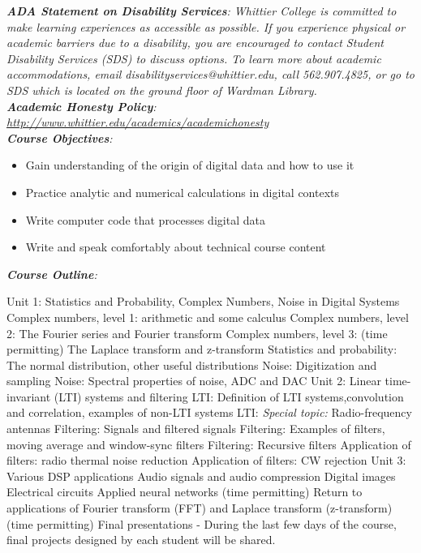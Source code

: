 \documentclass[10pt]{article}
\begin{document}
\textit{\textbf{ADA Statement on Disability Services}: Whittier College is committed to make learning experiences as accessible as possible.  If you experience physical or academic barriers due to a disability, you are encouraged to contact Student Disability Services (SDS) to discuss options.  To learn more about academic accommodations, email disabilityservices@whittier.edu, call 562.907.4825, or go to SDS which is located on the ground floor of Wardman Library.} \\
\textit{\textbf{Academic Honesty Policy}: \url{http://www.whittier.edu/academics/academichonesty}} \\
\clearpage
\textit{\textbf{Course Objectives}:}
\begin{itemize}
\item Gain understanding of the origin of digital data and how to use it
\item Practice analytic and numerical calculations in digital contexts
\item Write computer code that processes digital data
\item Write and speak comfortably about technical course content
\end{itemize}
\textit{\textbf{Course Outline}:}
\begin{outline}[enumerate]
\1 Unit 1: Statistics and Probability, Complex Numbers, Noise in Digital Systems
\2 Complex numbers, level 1: arithmetic and some calculus
\2 Complex numbers, level 2: The Fourier series and Fourier transform
\2 Complex numbers, level 3: (time permitting) The Laplace transform and z-transform
\2 Statistics and probability: The normal distribution, other useful distributions
\2 Noise: Digitization and sampling
\2 Noise: Spectral properties of noise, ADC and DAC
\1 Unit 2: Linear time-invariant (LTI) systems and filtering
\2 LTI: Definition of LTI systems,convolution and correlation, examples of non-LTI systems
\2 LTI: \textit{Special topic:} Radio-frequency antennas
\2 Filtering: Signals and filtered signals
\2 Filtering: Examples of filters, moving average and window-sync filters
\2 Filtering: Recursive filters
\2 Application of filters: radio thermal noise reduction
\2 Application of filters: CW rejection
\1 Unit 3: Various DSP applications
\2 Audio signals and audio compression
\2 Digital images
\2 Electrical circuits
\2 Applied neural networks (time permitting)
\2 Return to applications of Fourier transform (FFT) and Laplace transform (z-transform) (time permitting)
\1 Final presentations - During the last few days of the course, final projects designed by each student will be shared.
\end{outline}
\end{document}
